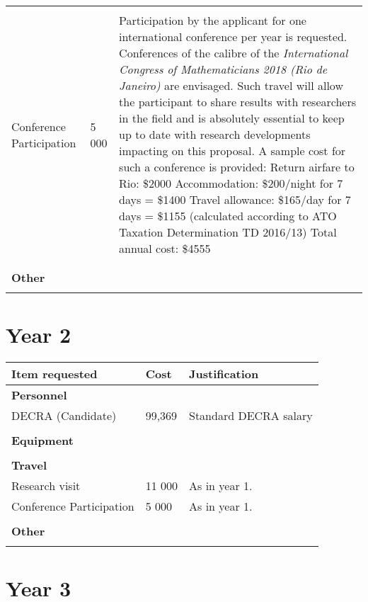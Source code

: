 \documentclass{amsart}
\begin{document}
\begin{center}
\begin{tabular}{|l|l|p{10cm}|}
 &  & \\
Conference Participation & 5 000 & Participation by the applicant for one international conference per year is requested. Conferences of the calibre of the \emph{International Congress of Mathematicians 2018 (Rio de Janeiro)} are envisaged. Such travel will allow the participant to share results with researchers in the field and is absolutely essential to keep up to date with research developments impacting on this proposal. A sample cost for such a conference is provided: Return airfare to Rio: \$2000 Accommodation: \$200/night for 7 days = \$1400 Travel allowance: \$165/day for 7 days = \$1155  (calculated according to ATO Taxation Determination TD 2016/13) Total annual cost: \$4555\\
 &  & \\
 &  & \\
\textbf{Other} &  & \\
 &  & \\
\hline
\end{tabular}
\end{center}

\section*{Year 2}
\label{sec:orgheadline2}
\begin{center}
\begin{tabular}{|l|l|p{10cm}|}
\hline
\textbf{Item requested} & \textbf{Cost} & \textbf{Justification}\\
\hline
\textbf{Personnel} &  & \\
DECRA (Candidate) & 99,369 & Standard DECRA salary\\
 &  & \\
\textbf{Equipment} &  & \\
 &  & \\
\textbf{Travel} &  & \\
Research visit & 11 000 & As in year 1.\\
Conference Participation & 5 000 & As in year 1.\\
 &  & \\
\textbf{Other} &  & \\
 &  & \\
\hline
\end{tabular}
\end{center}


\section*{Year 3}
\label{sec:orgheadline3}
\end{document}
